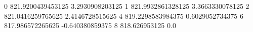 0 821.9200439453125 3.2930908203125
1 821.9932861328125 3.3663330078125
2 821.0416259765625 2.4146728515625
4 819.2298583984375 0.6029052734375
6 817.986572265625 -0.640380859375
8 818.626953125 0.0
